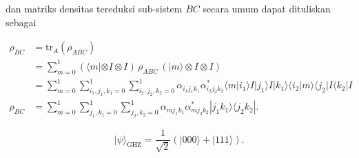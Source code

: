 dan matriks densitas tereduksi sub-sistem $BC$ secara umum dapat dituliskan sebagai

\begin{align}
\rho_{BC} &= \mathrm{tr}_A(\rho_{ABC}) \nonumber \\
&= \sum_{m=0}^{1} (\langle m| \otimes I \otimes I)\, \rho_{ABC}\, (|m\rangle \otimes I \otimes I) \nonumber \\
&= \sum_{m=0}^{1} \sum_{i_1,j_1,k_1=0}^{1} \sum_{i_2,j_2,k_2=0}^{1}
\alpha_{i_1 j_1 k_1}\alpha^{*}_{i_2 j_2 k_2}
\langle m|i_1\rangle I |j_1\rangle I |k_1\rangle
\langle i_2|m\rangle \langle j_2| I \langle k_2| I \nonumber \\
\rho_{BC} &= \sum_{m=0}^{1} \sum_{j_1,k_1=0}^{1} \sum_{j_2,k_2=0}^{1}
\alpha_{m j_1 k_1}\alpha^{*}_{m j_2 k_2}
|j_1 k_1\rangle \langle j_2 k_2| .
\end{align}


\begin{equation}
|\psi\rangle_{\mathrm{GHZ}} = \frac{1}{\sqrt{2}} (|000\rangle + |111\rangle) .
\end{equation}


